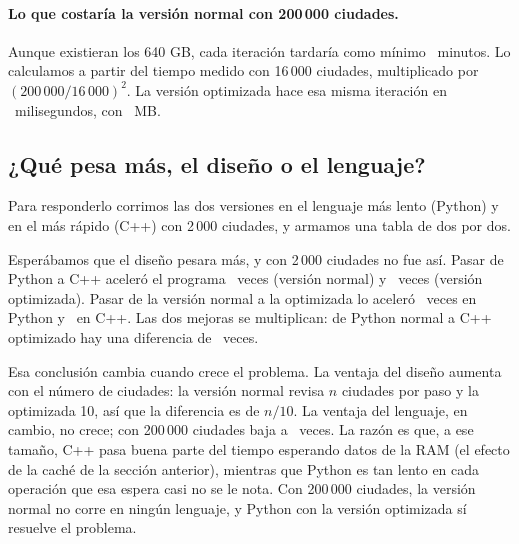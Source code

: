 \documentclass[11pt,a4paper]{article}
\begin{document}
\paragraph{Lo que costaría la versión normal con 200\,000 ciudades.} Aunque existieran
los 640 GB, cada iteración tardaría como mínimo \ExtrapTiempoNormalDoscientosMil\
minutos. Lo calculamos a partir del tiempo medido con 16\,000 ciudades, multiplicado
por $(200\,000/16\,000)^2$. La versión optimizada hace esa misma iteración en
\TitOptDoscientosMil\ milisegundos, con \MemOptDoscientosMil\ MB.

\subsection{¿Qué pesa más, el diseño o el lenguaje?}
\label{sec:2x2}

Para responderlo corrimos las dos versiones en el lenguaje más lento (Python) y en el
más rápido (C++) con 2\,000 ciudades, y armamos una tabla de dos por dos.

\begin{table}[H]
\centering
\small

\caption{Diseño contra lenguaje con 2\,000 ciudades. Comparando columnas se ve cuánto
aporta el diseño; comparando filas, cuánto aporta el lenguaje.}
\label{tab:2x2}
\end{table}

Esperábamos que el diseño pesara más, y con 2\,000 ciudades no fue así. Pasar de
Python a C++ aceleró el programa \RatioLenguajeNormal\ veces (versión normal) y
\RatioLenguajeOpt\ veces (versión optimizada). Pasar de la versión normal a la
optimizada lo aceleró \RatioDisenoPython\ veces en Python y \RatioDisenoCpp\ en C++. Las dos
mejoras se multiplican: de Python normal a C++ optimizado hay una diferencia de
\RatioTotal\ veces.

Esa conclusión cambia cuando crece el problema. La ventaja del diseño aumenta con el
número de ciudades: la versión normal revisa $n$ ciudades por paso y la optimizada
10, así que la diferencia es de $n/10$. La ventaja del lenguaje, en cambio, no crece;
con 200\,000 ciudades baja a \RatioLenguajeDoscientosMil\ veces. La razón es que, a ese
tamaño, C++ pasa buena parte del tiempo esperando datos de la RAM (el efecto de la
caché de la sección anterior), mientras que Python es tan lento en cada operación que
esa espera casi no se le nota. Con 200\,000 ciudades, la versión normal no corre en
ningún lenguaje, y Python con la versión optimizada sí resuelve el problema.
\end{document}
